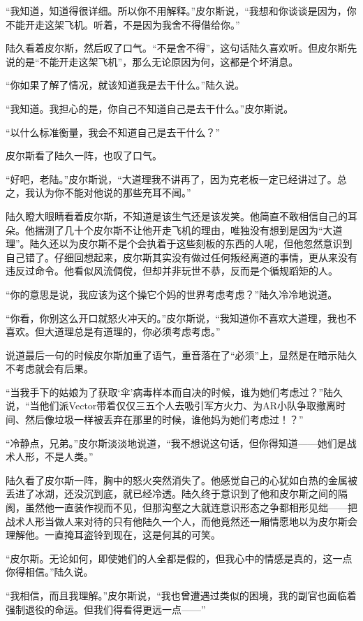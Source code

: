 “我知道，知道得很详细。所以你不用解释。”皮尔斯说，“我想和你谈谈是因为，你不能开走这架飞机。听着，不是因为我舍不得借给你。”

陆久看着皮尔斯，然后叹了口气。“不是舍不得”，这句话陆久喜欢听。但皮尔斯先说的是“不能开走这架飞机”，那么无论原因为何，这都是个坏消息。

“你如果了解了情况，就该知道我是去干什么。”陆久说。

“我知道。我担心的是，你自己不知道自己是去干什么。”皮尔斯说。

“以什么标准衡量，我会不知道自己是去干什么？”

皮尔斯看了陆久一阵，也叹了口气。

“好吧，老陆。”皮尔斯说，“大道理我不讲再了，因为克老板一定已经讲过了。总之，我认为你不能对他说的那些充耳不闻。”

陆久瞪大眼睛看着皮尔斯，不知道是该生气还是该发笑。他简直不敢相信自己的耳朵。他揣测了几十个皮尔斯不让他开走飞机的理由，唯独没有想到是因为“大道理”。陆久还以为皮尔斯不是个会执着于这些刻板的东西的人呢，但他忽然意识到自己错了。仔细回想起来，皮尔斯其实没有做过任何叛经离道的事情，更从来没有违反过命令。他看似风流倜傥，但却并非玩世不恭，反而是个循规蹈矩的人。

“你的意思是说，我应该为这个操它个妈的世界考虑考虑？”陆久冷冷地说道。

“你看，你别这么开口就怒火冲天的。”皮尔斯说，“我知道你不喜欢大道理，我也不喜欢。但大道理总是有道理的，你必须考虑考虑。”

说道最后一句的时候皮尔斯加重了语气，重音落在了“必须”上，显然是在暗示陆久不考虑就会有后果。

“当我手下的姑娘为了获取‘伞’病毒样本而自决的时候，谁为她们考虑过？”陆久说，“当他们派Vector带着仅仅三五个人去吸引军方火力、为AR小队争取撤离时间、然后像垃圾一样被丢弃在那里的时候，谁他妈为她们考虑过！？”

“冷静点，兄弟。”皮尔斯淡淡地说道，“我不想说这句话，但你得知道——她们是战术人形，不是人类。”

陆久看了皮尔斯一阵，胸中的怒火突然消失了。他感觉自己的心犹如白热的金属被丢进了冰湖，还没沉到底，就已经冷透。陆久终于意识到了他和皮尔斯之间的隔阂，虽然他一直装作视而不见，但那沟壑之大就连意识形态之争都相形见绌——把战术人形当做人来对待的只有他陆久一个人，而他竟然还一厢情愿地以为皮尔斯会理解他。一直掩耳盗铃到现在，这是何其的可笑。

“皮尔斯。无论如何，即使她们的人全都是假的，但我心中的情感是真的，这一点你得相信。”陆久说。

“我相信，而且我理解。”皮尔斯说，“我也曾遭遇过类似的困境，我的副官也面临着强制退役的命运。但我们得看得更远一点——”

